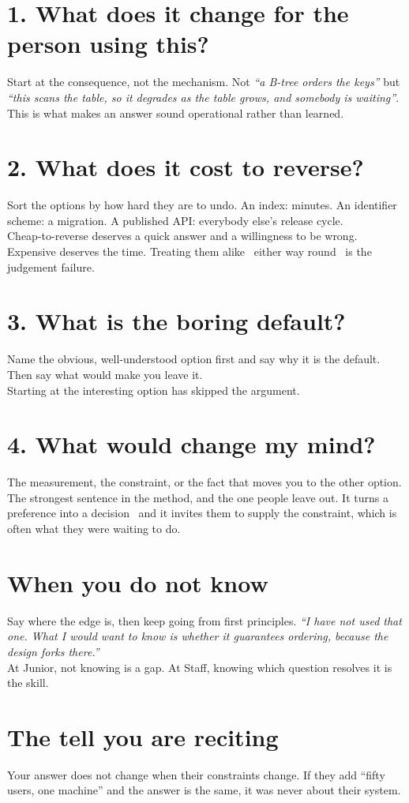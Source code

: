 


\section{1. What does it change for the person using this?}
Start at the consequence, not the mechanism. Not \textit{``a B-tree orders the
keys''} but \textit{``this scans the table, so it degrades as the table grows,
and somebody is waiting''}.\\
{\color{kitgrey}This is what makes an answer sound operational rather than
learned.}

\section{2. What does it cost to reverse?}
Sort the options by how hard they are to undo. An index: minutes. An identifier
scheme: a migration. A published API: everybody else's release cycle.\\
{\color{kitgrey}Cheap-to-reverse deserves a quick answer and a willingness to
be wrong. Expensive deserves the time. Treating them alike \dash\ either way
round \dash\ is the judgement failure.}

\section{3. What is the boring default?}
Name the obvious, well-understood option first and say why it is the default.
Then say what would make you leave it.\\
{\color{kitgrey}Starting at the interesting option has skipped the argument.}

\section{4. What would change my mind?}
The measurement, the constraint, or the fact that moves you to the other
option.\\
{\color{kitgrey}The strongest sentence in the method, and the one people leave
out. It turns a preference into a decision \dash\ and it invites them to supply
the constraint, which is often what they were waiting to do.}

\section{When you do not know}
Say where the edge is, then keep going from first principles.
\textit{``I have not used that one. What I would want to know is whether it
guarantees ordering, because the design forks there.''}\\
{\color{kitgrey}At Junior, not knowing is a gap. At Staff, knowing which
question resolves it is the skill.}

\section{The tell you are reciting}
Your answer does not change when their constraints change. If they add
``fifty users, one machine'' and the answer is the same, it was never about
their system.


